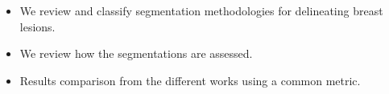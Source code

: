 \documentclass{article}
\begin{document}
\begin{itemize}
    \item{We review and classify segmentation methodologies for delineating breast lesions.}
    \item{We review how the segmentations are assessed.}
    \item{Results comparison from the different works using a common metric.}
\end{itemize}
\end{document}
